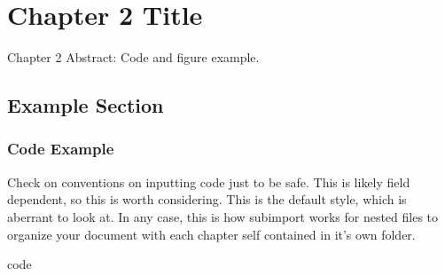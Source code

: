 \chapter{Chapter 2 Title}

\begin{chapterabstract}
Chapter 2 Abstract: Code and figure example.
\end{chapterabstract}

\section{Example Section}

\subsection{Code Example}
Check on conventions on inputting code just to be safe.
This is likely field dependent, so this is worth considering. 
This is the default style, which is aberrant to look at.
In any case, this is how subimport works for nested files to organize your document with each chapter self contained in it's own folder.

{code}

